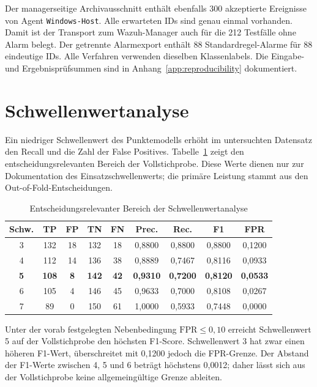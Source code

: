 \documentclass[12pt,a4paper,oneside,parskip=half]{scrreprt}
\begin{document}
Der managerseitige Archivausschnitt enthält ebenfalls 300 akzeptierte Ereignisse von Agent \texttt{Windows-Host}. Alle erwarteten IDs sind genau einmal vorhanden. Damit ist der Transport zum Wazuh-Manager auch für die 212 Testfälle ohne Alarm belegt. Der getrennte Alarmexport enthält 88 Standardregel-Alarme für 88 eindeutige IDs. Alle Verfahren verwenden dieselben Klassenlabels. Die Eingabe- und Ergebnisprüfsummen sind in Anhang~\ref{app:reproducibility} dokumentiert.

\section{Schwellenwertanalyse}
Ein niedriger Schwellenwert des Punktemodells erhöht im untersuchten Datensatz den Recall und die Zahl der False Positives. Tabelle~\ref{tab:threshold-focus} zeigt den entscheidungsrelevanten Bereich der Vollstichprobe. Diese Werte dienen nur zur Dokumentation des Einsatzschwellenwerts; die primäre Leistung stammt aus den Out-of-Fold-Entscheidungen.

\begin{table}[H]
\centering
\caption[Entscheidungsrelevanter Bereich der Schwellenwertanalyse]{Entscheidungsrelevanter Bereich der Schwellenwertanalyse}
\label{tab:threshold-focus}
\begingroup
\small
\setlength{\tabcolsep}{3pt}
\begin{tabular}{|c|c|c|c|c|c|c|c|c|}
\hline
\textbf{Schw.} & \textbf{TP} & \textbf{FP} & \textbf{TN} & \textbf{FN} & \textbf{Prec.} & \textbf{Rec.} & \textbf{F1} & \textbf{FPR}\\
\hline
3 & 132 & 18 & 132 & 18 & 0{,}8800 & 0{,}8800 & 0{,}8800 & 0{,}1200\\
\hline
4 & 112 & 14 & 136 & 38 & 0{,}8889 & 0{,}7467 & 0{,}8116 & 0{,}0933\\
\hline
\textbf{5} & \textbf{108} & \textbf{8} & \textbf{142} & \textbf{42} & \textbf{0{,}9310} & \textbf{0{,}7200} & \textbf{0{,}8120} & \textbf{0{,}0533}\\
\hline
6 & 105 & 4 & 146 & 45 & 0{,}9633 & 0{,}7000 & 0{,}8108 & 0{,}0267\\
\hline
7 & 89 & 0 & 150 & 61 & 1{,}0000 & 0{,}5933 & 0{,}7448 & 0{,}0000\\
\hline
\end{tabular}
\endgroup
\end{table}

Unter der vorab festgelegten Nebenbedingung \(\mathrm{FPR}\leq 0{,}10\) erreicht Schwellenwert 5 auf der Vollstichprobe den höchsten F1-Score. Schwellenwert 3 hat zwar einen höheren F1-Wert, überschreitet mit 0{,}1200 jedoch die FPR-Grenze. Der Abstand der F1-Werte zwischen 4, 5 und 6 beträgt höchstens 0{,}0012; daher lässt sich aus der Vollstichprobe keine allgemeingültige Grenze ableiten.
\end{document}
